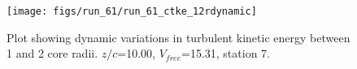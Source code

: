 \begin{figure}[H]
\centering
\texttt{[image: figs/run\_61/run\_61\_ctke\_12rdynamic]}
\caption{Plot showing dynamic variations in turbulent kinetic energy between 1 and 2 core radii. $z/c$=10.00, $V_{free}$=15.31, station 7.}
\end{figure}


